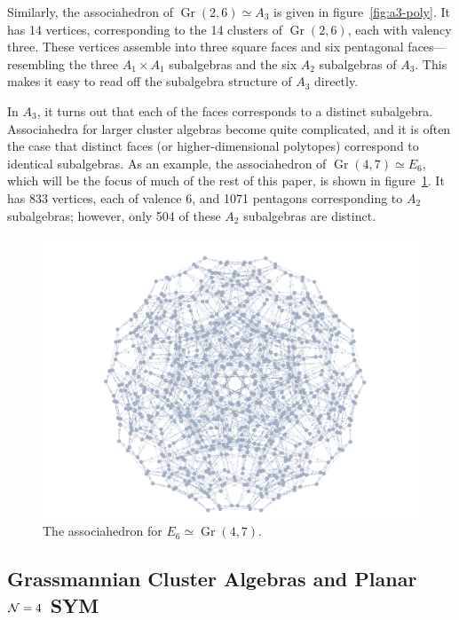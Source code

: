 \documentclass[11pt]{article}
\DeclareMathOperator{\Gr}{Gr}
\begin{document}
Similarly, the associahedron of $\Gr(2,6) \simeq A_3$ is given in figure~\ref{fig:a3-poly}. It has 14 vertices, corresponding to the 14 clusters of $\Gr(2,6)$, each with valency three. These vertices assemble into three square faces and six pentagonal faces---resembling the three $A_1 \times A_1$ subalgebras and the six $A_2$ subalgebras of $A_3$. This makes it easy to read off the subalgebra structure of $A_3$ directly. 

In $A_3$, it turns out that each of the faces corresponds to a distinct subalgebra. Associahedra for larger cluster algebras become quite complicated, and it is often the case that distinct faces (or higher-dimensional polytopes) correspond to identical subalgebras. As an example, the associahedron of $\Gr(4,7)\simeq E_6$, which will be the focus of much of the rest of this paper, is shown in figure~\ref{fig:e6-poly}. It has 833 vertices, each of valence 6, and 1071 pentagons corresponding to $A_2$ subalgebras; however, only 504 of these $A_2$ subalgebras are distinct.

\begin{figure}[t]  \centering
  \includegraphics[scale=0.25]{e6-associahedron}
  \caption{The associahedron for $E_6\simeq\Gr(4,7)$.}
  \label{fig:e6-poly}
\end{figure}

\subsection{Grassmannian Cluster Algebras and Planar ${\cal N} = 4$ SYM }
\end{document}
